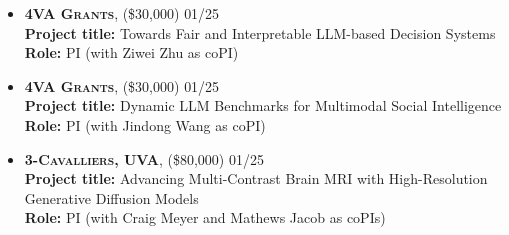 \begin{itemize}
	\item \textbf{\textsc{4VA Grants}}, 
	(\$30,000) \hfill \textsc{01/25}\\
	{\bf Project title:} {Towards Fair and Interpretable LLM-based Decision Systems}\\
	{\bf Role:} PI (with Ziwei Zhu as coPI)

	\item \textbf{\textsc{4VA Grants}}, 
	(\$30,000) \hfill \textsc{01/25}\\
	{\bf Project title:} {Dynamic LLM Benchmarks for Multimodal Social Intelligence}\\
	{\bf Role:} PI (with Jindong Wang as coPI)

	\item \textbf{\textsc{3-Cavalliers, UVA}}, 
	(\$80,000) \hfill \textsc{01/25}\\
	{\bf Project title:} {Advancing Multi-Contrast Brain MRI with High-Resolution Generative Diffusion Models}\\
	{\bf Role:} PI (with Craig Meyer and Mathews Jacob as coPIs)

\end{itemize}

